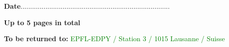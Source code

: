 \documentclass[11pt,titlepage]{article}
\begin{document}
\noindent \textbf{Date}\hspace{8.05cm}..............................................................................\\

\vspace{0.8cm}
\begin{center}
\textbf{Up to 5 pages in total}
\end{center}
\begin{center}
\textbf{To be returned to:} \textcolor{green}{EPFL-EDPY / Station 3 / 1015 Lausanne / Suisse}
\end{center}
\end{document}
